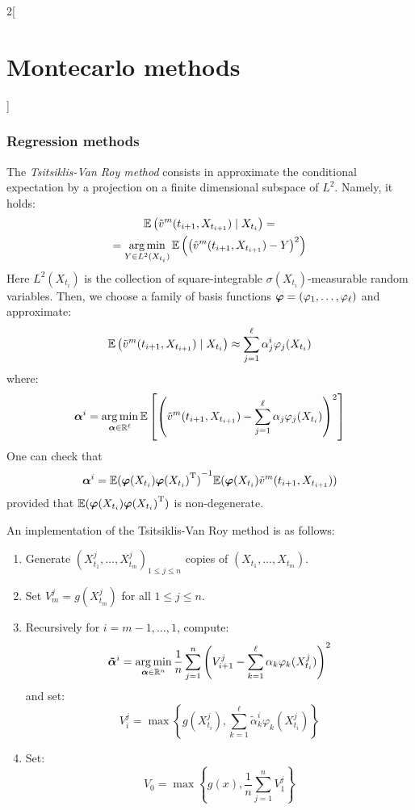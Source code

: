 \documentclass[../../../main_math.tex]{subfiles}
\begin{document}
\begin{multicols}{2}[\section{Montecarlo methods}]
  \subsubsection{Regression methods}
  \begin{definition}
    The \emph{Tsitsiklis-Van Roy method} consists in approximate the conditional expectation by a projection on a finite dimensional subspace of $L^2$. Namely, it holds:
    \begin{multline*}
      \mathbb{E}\left(\tilde{v}^m(t_{i+1},X_{t_{i+1}})\mid X_{t_i}\right)=\\=\operatorname*{arg\,min}_{Y\in L^2(X_{t_i})}\mathbb{E}\left(\left(\tilde{v}^m(t_{i+1},X_{t_{i+1}})-Y\right)^2\right)
    \end{multline*}
    Here $L^2(X_{t_i})$ is the collection of square-integrable $\sigma(X_{t_i})$-measurable random variables. Then, we choose a family of basis functions $\boldsymbol{\mathrm{\varphi}}=(\varphi_1,\ldots,\varphi_\ell)$ and approximate:
    $$
      \mathbb{E}\left(\tilde{v}^m(t_{i+1},X_{t_{i+1}})\mid X_{t_i}\right)\approx \sum_{j=1}^\ell \alpha_j^i\varphi_j(X_{t_i})
    $$
    where:
    $$
      \boldsymbol{\mathrm{\alpha}}^i=\operatorname*{arg\,min}_{\boldsymbol{\mathrm{\alpha}}\in\mathbb{R}^\ell}\mathbb{E}\left[\left(\tilde{v}^m(t_{i+1},X_{t_{i+1}})-\sum_{j=1}^\ell \alpha_j\varphi_j(X_{t_i})\right)^2\right]
    $$
    One can check that $$
      \boldsymbol{\mathrm{\alpha}}^i={\mathbb{E}(\boldsymbol{\mathrm{\varphi}}(X_{t_i}){\boldsymbol{\mathrm{\varphi}}(X_{t_i})}^{\mathrm{T}})}^{-1}\mathbb{E}(\boldsymbol{\mathrm{\varphi}}(X_{t_i})\tilde{v}^m(t_{i+1},X_{t_{i+1}}))
    $$
    provided that $\mathbb{E}(\boldsymbol{\mathrm{\varphi}}(X_{t_i}){\boldsymbol{\mathrm{\varphi}}(X_{t_i})}^{\mathrm{T}})$ is non-degenerate.
  \end{definition}
  \begin{proposition}
    An implementation of the Tsitsiklis-Van Roy method is as follows:
    \begin{enumerate}
      \item Generate ${(X_{t_1}^j,\ldots,X_{t_m}^j)}_{1\leq j\leq n}$ \iid copies of $(X_{t_1},\ldots,X_{t_m})$.
      \item Set $V_m^j=g(X_{t_m}^j)$ for all $1\leq j\leq n$.
      \item Recursively for $i=m-1,\ldots,1$, compute:
            $$
              \boldsymbol{\mathrm{\tilde{\alpha}}}^i=\operatorname*{arg\,min}_{\boldsymbol{\mathrm{\alpha}}\in\mathbb{R}^n}\frac{1}{n}\sum_{j=1}^n\left(V_{i+1}^j-\sum_{k=1}^\ell\alpha_k\varphi_k(X_{t_i}^j)\right)^2
            $$
            and set:
            $$
              V_i^j=\max\left\{ g(X_{t_i}^j),\sum_{k=1}^\ell\tilde{\alpha}_k^i\varphi_k(X_{t_i}^j)\right\}
            $$
      \item Set:
            $$V_0=\max\left\{ g(x),\frac{1}{n}\sum_{j=1}^n V_1^j\right\}$$

\end{enumerate}
\end{proposition}
\end{multicols}
\end{document}
